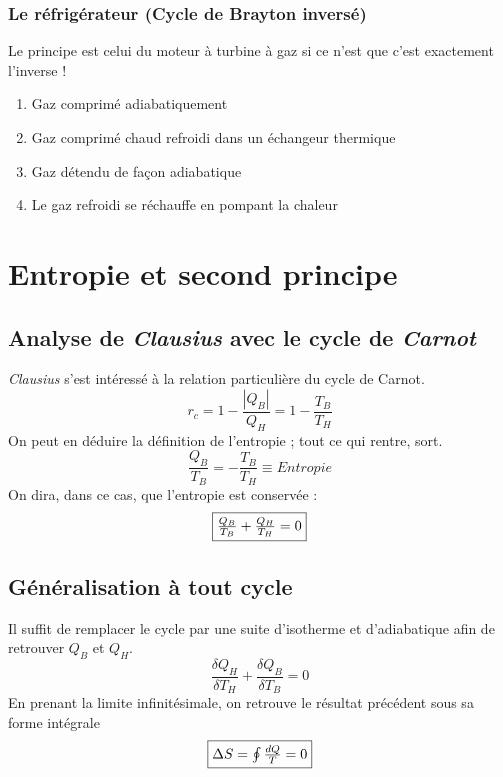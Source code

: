 \documentclass	[11pt, a4paper, openany]{book}
\begin{document}
\subsubsection{Le réfrigérateur (Cycle de Brayton inversé)}
Le principe est celui du moteur à turbine à gaz si ce n'est que c'est exactement l'inverse !
\begin{enumerate}
	\item Gaz comprimé adiabatiquement
	\item Gaz comprimé chaud refroidi dans un échangeur thermique
	\item Gaz détendu de façon adiabatique
	\item Le gaz refroidi se réchauffe en pompant la chaleur
\end{enumerate}

\newpage
\section{Entropie et second principe}
\subsection{Analyse de \textit{Clausius} avec le cycle de \textit{Carnot}}
\textit{Clausius} s'est intéressé à la relation particulière du cycle de Carnot.
\begin{equation}
	r_c = 1 - \frac{|Q_B|}{Q_H} = 1 - \frac{T_B}{T_H}
\end{equation}
On peut en déduire la définition de l'entropie ; tout ce qui rentre, sort.
\begin{equation}
	\frac{Q_B}{T_B} = -\frac{T_B}{T_H} \equiv Entropie
\end{equation}
On dira, dans ce cas, que l'entropie est conservée :
\begin{equation}
	\fbox{$\frac{Q_B}{T_B} + \frac{Q_H}{T_H} = 0$}
\end{equation}

\subsection{Généralisation à tout cycle}
Il suffit de remplacer le cycle par une suite d'isotherme et d'adiabatique afin de retrouver $Q_B$ et $Q_H$.
\begin{equation}
	\frac{\delta Q_H}{\delta T_H} + \frac{\delta Q_B}{\delta T_B} = 0
\end{equation}
En prenant la limite infinitésimale, on retrouve le résultat précédent sous sa forme intégrale
\begin{equation}
	\fbox{$\Delta S =\oint \frac{dQ}{T} = 0$}
\end{equation}
\end{document}
